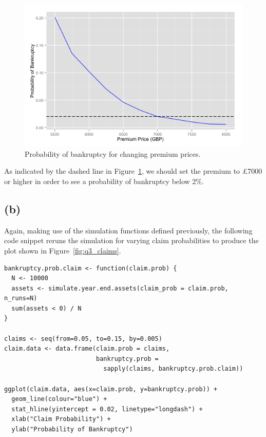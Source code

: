 \documentclass{article}
\begin{document}
\begin{figure}
  \includegraphics[width=\textwidth]{q3_premiums}
  \caption{Probability of bankruptcy for changing premium prices.}
  \centering
\label{fig:q3_premiums}
\end{figure}

As indicated by the dashed line in Figure~\ref{fig:q3_premiums}, we
should set the premium to \pounds{7000} or higher in order to see a probability
of bankruptcy below 2\%.

\subsection*{(b)}

Again, making use of the simulation functions defined previously, the
following code snippet reruns the simulation for varying claim
probabilities to produce the plot shown in Figure~\ref{fig:q3_claims}.

\begin{verbatim}
bankruptcy.prob.claim <- function(claim.prob) {
  N <- 10000
  assets <- simulate.year.end.assets(claim_prob = claim.prob, n_runs=N)
  sum(assets < 0) / N
}

claims <- seq(from=0.05, to=0.15, by=0.005)
claim.data <- data.frame(claim.prob = claims,
                         bankruptcy.prob =
                           sapply(claims, bankruptcy.prob.claim))

ggplot(claim.data, aes(x=claim.prob, y=bankruptcy.prob)) +
  geom_line(colour="blue") +
  stat_hline(yintercept = 0.02, linetype="longdash") +
  xlab("Claim Probability") +
  ylab("Probability of Bankruptcy")
\end{verbatim}
\end{document}

